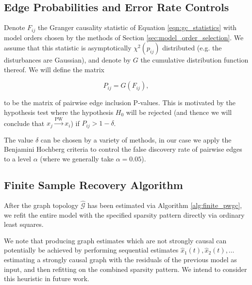 \documentclass{statsoc}
\def\pwgc{\overset{\text{PW}}{\rightarrow}}  %
\def\gcg{\mathcal{G}}  %
\begin{document}
\subsection{Edge Probabilities and Error Rate Controls}
\label{sec:error_rate_control}
Denote $F_{ij}$ the Granger causality statistic of Equation
\eqref{eqn:gc_statistics} with model orders chosen by the methods of
Section \ref{sec:model_order_selection}.  We assume that this
statistic is asymptotically $\chi^2(p_{ij})$ distributed (e.g. the
disturbances are Gaussian), and denote by $G$ the cumulative
distribution function thereof.  We will define the matrix

\begin{equation}
  \label{eqn:edge_inclusion_probability}
  P_{ij} = G(F_{ij}),
\end{equation}

to be the matrix of pairwise edge inclusion P-values.  This is
motivated by the hypothesis test where the hypothesis $H_0$ will be
rejected (and thence we will conclude that $x_j \pwgc x_i$) if
$P_{ij} > 1 - \delta$.

The value $\delta$ can be chosen by a variety of methods, in our case
we apply the Benjamini Hochberg criteria \cite{benjamini_hochberg}
\cite{all_of_statistics} to control the false discovery rate of
pairwise edges to a level $\alpha$ (where we generally take
$\alpha = 0.05$).

\subsection{Finite Sample Recovery Algorithm}
\label{sec:finite_pwgc}

After the graph topology $\widehat{\gcg}$ has been estimated via
Algorithm \ref{alg:finite_pwgc}, we refit the entire model with the
specified sparsity pattern directly via ordinary least squares.

We note that producing graph estimates which are not strongly causal
can potentially be achieved by performing sequential estimates
$\widehat{x}_1(t), \widehat{x}_2(t), \ldots$ estimating a strongly causal
graph with the residuals of the previous model as input, and then
refitting on the combined sparsity pattern.  We intend to consider
this heuristic in future work.
\end{document}
